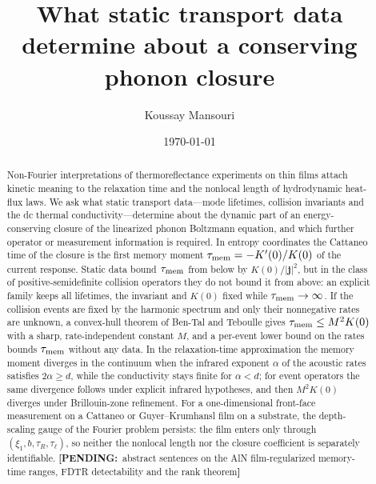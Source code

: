 \documentclass[aps,prb,reprint,amsmath,amssymb,superscriptaddress,floatfix,nofootinbib]{revtex4-2}
\newcommand{\PENDING}[1]{{\color{red}\textbf{[PENDING:}~#1\textbf{]}}}
\theoremstyle{plain}
\theoremstyle{definition}
\theoremstyle{remark}
\newcommand{\jj}{\mathbf j}
\newcommand{\tmem}{\tau_{\rm mem}}
\begin{document}
\title{What static transport data determine about a conserving phonon closure}

\author{Koussay Mansouri}

\date{\today}

\begin{abstract}
Non-Fourier interpretations of thermoreflectance experiments on thin films attach kinetic meaning to
the relaxation time and the nonlocal length of hydrodynamic heat-flux laws. We ask what static
transport data---mode lifetimes, collision invariants and the dc thermal conductivity---determine
about the dynamic part of an energy-conserving closure of the linearized phonon Boltzmann equation,
and which further operator or measurement information is required. In entropy coordinates the
Cattaneo time of the closure is the first memory moment $\tmem=-K'(0)/K(0)$ of the current response.
Static data bound $\tmem$ from below by $K(0)/|\jj|^2$, but in the class of positive-semidefinite
collision operators they do not bound it from above: an explicit family keeps all lifetimes, the
invariant and $K(0)$ fixed while $\tmem\to\infty$. If the collision events are fixed by the harmonic
spectrum and only their nonnegative rates are unknown, a convex-hull theorem of Ben-Tal and Teboulle
gives $\tmem\le M^2K(0)$ with a sharp, rate-independent constant $M$, and a per-event lower bound on
the rates bounds $\tmem$ without any data. In the relaxation-time approximation the memory moment
diverges in the continuum when the infrared exponent $\alpha$ of the acoustic rates satisfies
$2\alpha\ge d$, while the conductivity stays finite for $\alpha<d$; for event operators the same
divergence follows under explicit infrared hypotheses, and then $M^2K(0)$ diverges under
Brillouin-zone refinement. For a one-dimensional front-face measurement on a Cattaneo or
Guyer--Krumhansl film on a substrate, the depth-scaling gauge of the Fourier problem persists: the film
enters only through $(\xi_1,b,\tau_R,\tau_\ell)$, so neither the nonlocal length nor the closure
coefficient is separately identifiable. \PENDING{abstract sentences on the AlN film-regularized
memory-time ranges, FDTR detectability and the rank theorem}
\end{abstract}
\end{document}
